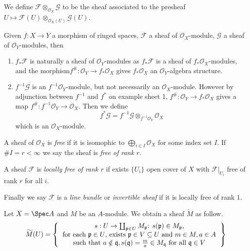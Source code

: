 \documentclass[a4paper]{article}
\newcommand{\sh}[1]{\mathcal{#1}} %
\begin{document}
We define \(\sh F \otimes_{\sh O_X} \sh G\) to be the sheaf associated to the presheaf \(U \mapsto \sh F(U) \otimes_{\sh O_X(U)} \sh G(U)\).

Given \(f: X \to Y\) a morphism of ringed spaces, \(\sh F\) a sheaf of \(\sh O_X\)-module, \(\sh G\) a sheaf of \(\sh O_Y\)-modules, then
\begin{enumerate}
\item \(f_*\sh F\) is naturally a sheaf of \(\sh O_Y\)-modules as \(f_*\sh F\) is a sheaf of \(f_* \sh O_X\)-modules, and the morphism\(f^\#: \sh O_Y \to f_* \sh O_X\) gives \(f_* \sh O_X\) an \(\sh O_Y\)-algebra structure.
\item \(f^{-1} \sh G\) is an \(f^{-1} \sh O_Y\)-module, but not necessarily an \(\sh O_X\)-module. However by adjunction between \(f^{-1}\) and \(f^*\) on example sheet 1, \(f^\#: \sh O_Y \to f_* \sh O_X\) gives a map \(f^\#: f^{-1} \sh O_Y \to \sh O_X\). Then we define
  \[
    f^* \sh G = f^{-1} \sh G \otimes_{f^{-1} \sh O_Y} \sh O_X
  \]
  which is an \(\sh O_X\)-module.
\end{enumerate}

\begin{definition}
  A sheaf of \(\sh O_X\) is \emph{free} if it is isomophic to \(\bigoplus_{i \in I} \sh O_X\) for some index set \(I\). If \(\# I = r < \infty\) we say the sheaf is \emph{free of rank \(r\)}.

  A sheaf \(\sh F\) is \emph{locally free of rank \(r\)} if exists \(\{U_i\}\) open cover of \(X\) with \(\sh F|_{U_i}\) free of rank \(r\) for all \(i\).

  Finally we say \(\sh F\) is a \emph{line bundle} or \emph{invertible sheaf} if it is locally free of rank \(1\).
\end{definition}

\begin{eg}
  Let \(X = \Spec A\) and \(M\) be an \(A\)-module. We obtain a sheaf \(\widetilde M\) as follow.
  \begin{align*}
    \widetilde M(U) =
    \left\{
    \begin{tabular}{c}
      \(s: U \to \coprod_{\mathfrak p \in U} M_{\mathfrak p}\): \(s(\mathfrak p) \in M_{\mathfrak p}\), \\
      for each \(\mathfrak p \in U\), exists \(\mathfrak p \in V \subseteq U\) and \(m \in M, a \in A\) \\
      such that \(a \notin \mathfrak q, s(\mathfrak q) = \frac{m}{a} \in M_{\mathfrak q}\) for all \(\mathfrak q \in V\)
    \end{tabular}
    \right\}
  \end{align*}
\end{eg}
\end{document}
